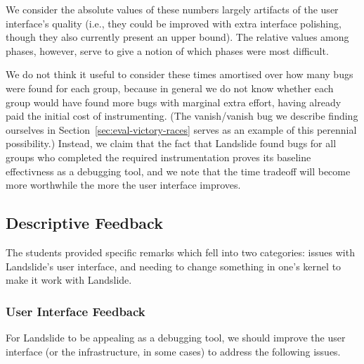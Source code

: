 {We consider the absolute values of these numbers largely artifacts of the user interface's quality (i.e., they could be improved with extra interface polishing, though they also currently present an upper bound). The relative values among phases, however, serve to give a notion of which phases were most difficult.

We do not think it useful to consider these times amortised over how many bugs were found for each group, because in general we do not know whether each group would have found more bugs with marginal extra effort, having already paid the initial cost of instrumenting. (The vanish/vanish bug we describe finding ourselves in Section~\ref{sec:eval-victory-races} serves as an example of this perennial possibility.)
Instead, we claim that the fact that Landslide found bugs for all groups who completed the required instrumentation proves its baseline effectivness as a debugging tool, and we note that the time tradeoff will become more worthwhile the more the user interface improves.
}

\subsection{Descriptive Feedback}
\label{sec:eval-feedback}

The students provided specific remarks which fell into two categories: issues with Landslide's user interface, and needing to change something in one's kernel to make it work with Landslide.

\subsubsection{User Interface Feedback}

For Landslide to be appealing as a debugging tool, we should improve the user interface (or the infrastructure, in some cases) to address the following issues.

